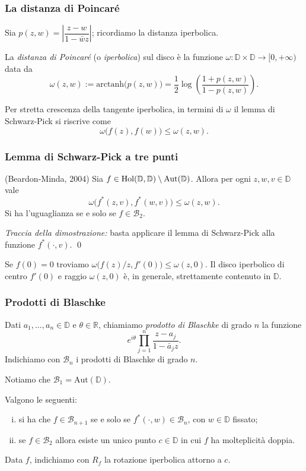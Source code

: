 \begin{frame}
  \frametitle{La distanza di Poincaré}
  Sia $p(z,w)=\left|\dfrac{z-w}{1-\bar{w}z}\right|$; ricordiamo la distanza iperbolica. \pause
  \begin{defn}
    La \textit{distanza di Poincaré} (o \textit{iperbolica}) sul disco è la funzione $\omega:\mathbb{D}\times \mathbb{D} \longrightarrow [0,+\infty)$ data da
    $$\omega(z,w):=\text{arctanh}\bigl(p(z,w)\bigr)=\frac{1}{2}\log\left(\frac{1+p(z,w)}{1-p(z,w)}\right).$$
  \end{defn}
  \pause
  Per stretta crescenza della tangente iperbolica, in termini di $\omega$ il lemma di Schwarz-Pick si riscrive come
  $$\omega\bigl(f(z),f(w)\bigr) \le \omega(z,w).$$
\end{frame}

\begin{frame}
  \frametitle{Lemma di Schwarz-Pick a tre punti}
  \begin{thm}
    (Beardon-Minda, 2004) Sia $f \in \text{\normalfont{Hol}}(\mathbb{D},\mathbb{D})\setminus\text{\normalfont{Aut}}(\mathbb{D})$. Allora per ogni $z, w, v \in \mathbb{D}$ vale
    \begin{equation}
      \omega\bigl(f^*(z,v),f^*(w,v)\bigr) \le \omega(z,w).
    \end{equation}
    Si ha l'uguaglianza se e solo se $f \in \mathcal{B}_2$.
  \end{thm}
  \pause
  \textit{Traccia della dimostrazione:} basta applicare il lemma di Schwarz-Pick alla funzione $f^*(\cdot,v)$. \qed
  \pause
  \begin{oss}
    Se $f(0)=0$ troviamo $\omega\bigl(f(z)/z,f'(0)\bigr) \le \omega(z,0)$. Il disco iperbolico di centro $f'(0)$ e raggio $\omega(z,0)$ è, in generale, strettamente contenuto in $\mathbb{D}$.
  \end{oss}
\end{frame}

\begin{frame}
  \frametitle{Prodotti di Blaschke}
  \begin{defn}
    Dati $a_1,\dots,a_n \in \mathbb{D}$ e $\theta \in \mathbb{R}$, chiamiamo \textit{prodotto di Blaschke} di grado $n$ la funzione
    $$e^{i\theta}\prod_{j=1}^n \frac{z-a_j}{1-\bar{a}_jz}.$$
    Indichiamo con $\mathcal{B}_n$ i prodotti di Blaschke di grado $n$.
  \end{defn}
  \pause
  Notiamo che $\mathcal{B}_1=\text{Aut}(\mathbb{D})$.
  \pause
  \begin{prop}
    Valgono le seguenti:
    \begin{enumerate}[(i)]
      \item si ha che $f \in \mathcal{B}_{n+1}$ se e solo se $f^*(\cdot,w) \in \mathcal{B}_n$, con $w \in \mathbb{D}$ fissato;
      \item se $f \in \mathcal{B}_2$ allora esiste un unico punto $c \in \mathbb{D}$ in cui $f$ ha molteplicità doppia.
    \end{enumerate}
  \end{prop}
  \pause
  Data $f$, indichiamo con $R_f$ la rotazione iperbolica attorno a $c$.
\end{frame}

